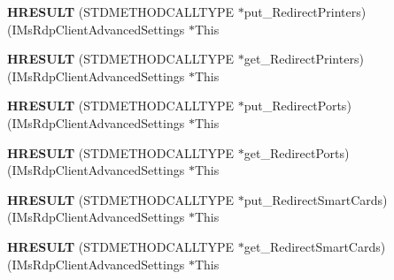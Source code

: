 \begin{DoxyCompactItemize}
\mbox{\label{struct_i_ms_rdp_client_advanced_settings_vtbl_ad2efb7113b12f7d6286a6929fc215a7c}} 
{\bfseries H\+R\+E\+S\+U\+LT} (S\+T\+D\+M\+E\+T\+H\+O\+D\+C\+A\+L\+L\+T\+Y\+PE $\ast$put\+\_\+\+Redirect\+Printers)(I\+Ms\+Rdp\+Client\+Advanced\+Settings $\ast$This
\item 
\mbox{\label{struct_i_ms_rdp_client_advanced_settings_vtbl_a9eaa42ca7841b8f1c7b6b87bb11f09b4}} 
{\bfseries H\+R\+E\+S\+U\+LT} (S\+T\+D\+M\+E\+T\+H\+O\+D\+C\+A\+L\+L\+T\+Y\+PE $\ast$get\+\_\+\+Redirect\+Printers)(I\+Ms\+Rdp\+Client\+Advanced\+Settings $\ast$This
\item 
\mbox{\label{struct_i_ms_rdp_client_advanced_settings_vtbl_ad39f1b8027f765ebf593fc7080b888e8}} 
{\bfseries H\+R\+E\+S\+U\+LT} (S\+T\+D\+M\+E\+T\+H\+O\+D\+C\+A\+L\+L\+T\+Y\+PE $\ast$put\+\_\+\+Redirect\+Ports)(I\+Ms\+Rdp\+Client\+Advanced\+Settings $\ast$This
\item 
\mbox{\label{struct_i_ms_rdp_client_advanced_settings_vtbl_af8621759860d29ccff103e5add94a72a}} 
{\bfseries H\+R\+E\+S\+U\+LT} (S\+T\+D\+M\+E\+T\+H\+O\+D\+C\+A\+L\+L\+T\+Y\+PE $\ast$get\+\_\+\+Redirect\+Ports)(I\+Ms\+Rdp\+Client\+Advanced\+Settings $\ast$This
\item 
\mbox{\label{struct_i_ms_rdp_client_advanced_settings_vtbl_a381d056665432e4d7b1f86b76360be81}} 
{\bfseries H\+R\+E\+S\+U\+LT} (S\+T\+D\+M\+E\+T\+H\+O\+D\+C\+A\+L\+L\+T\+Y\+PE $\ast$put\+\_\+\+Redirect\+Smart\+Cards)(I\+Ms\+Rdp\+Client\+Advanced\+Settings $\ast$This
\item 
\mbox{\label{struct_i_ms_rdp_client_advanced_settings_vtbl_ac68722caa3725f2101d1edfa09f9260d}} 
{\bfseries H\+R\+E\+S\+U\+LT} (S\+T\+D\+M\+E\+T\+H\+O\+D\+C\+A\+L\+L\+T\+Y\+PE $\ast$get\+\_\+\+Redirect\+Smart\+Cards)(I\+Ms\+Rdp\+Client\+Advanced\+Settings $\ast$This
\item 
\mbox{\label{struct_i_ms_rdp_client_advanced_settings_vtbl_a552ed25ecef61a8b7dc9dfcb40bd2d09}} 

\end{DoxyCompactItemize}
